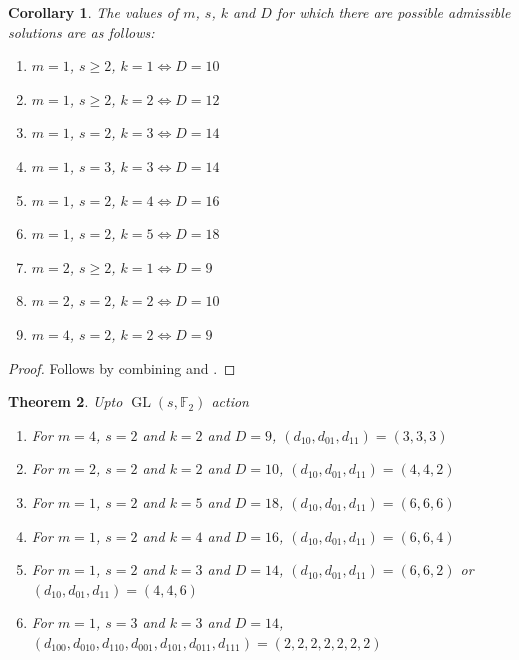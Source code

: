 \documentclass[12pt,twoside,]{amsart}
\theoremstyle{plain}
\newtheorem{theorem}{Theorem}[subsection]
\newtheorem{corollary}[theorem]{Corollary}
\theoremstyle{definition}
\begin{document}
\begin{corollary}\label{list of cases}
  The values of $m$, $s$, $k$ and $D$ for which there are possible admissible solutions are as follows: 
    \begin{enumerate}
        \item $m = 1$, $s \geq 2$, $k = 1 \iff D = 10$
        \item $m = 1$, $s \geq 2$, $k = 2 \iff D = 12$
        \item $m = 1$, $s = 2$, $k = 3 \iff D = 14$
        \item $m = 1$, $s = 3$, $k = 3 \iff D = 14$
        \item $m = 1$, $s = 2$, $k = 4 \iff D = 16$
        \item $m = 1$, $s = 2$, $k = 5 \iff D = 18$
        \item $m =2$, $s \geq 2$, $k = 1 \iff D = 9$
        \item $m = 2$, $s = 2$, $k = 2 \iff D = 10$
        \item $m = 4$, $s = 2$, $k = 2 \iff D = 9$
        
    \end{enumerate}
\end{corollary}

\begin{proof}
   Follows by combining  and . 
\end{proof}

\begin{theorem}
Upto $\operatorname{GL}(s,\mathbb{F}_2)$ action
 \begin{enumerate}
     \item For $m = 4$, $s=2$ and $k = 2$ and $D = 9$, $(d_{10}, d_{01}, d_{11}) = (3,3,3)$ 
     \item For $m = 2$, $s=2$ and $k = 2$ and $D = 10$, $(d_{10}, d_{01}, d_{11}) = (4,4,2)$ 
     \item For $m = 1$, $s=2$ and $k = 5$ and $D = 18$, $(d_{10}, d_{01}, d_{11}) = (6,6,6)$
     \item For $m = 1$, $s=2$ and $k = 4$ and $D = 16$, $(d_{10}, d_{01}, d_{11}) = (6,6,4)$
     \item For $m = 1$, $s=2$ and $k = 3$ and $D = 14$, $(d_{10}, d_{01}, d_{11}) = (6,6,2)$ or $(d_{10}, d_{01}, d_{11}) = (4,4,6)$
     \item For $m = 1$, $s=3$ and $k = 3$ and $D = 14$, 
     $(d_{100},d_{010},d_{110},d_{001},d_{101},d_{011},d_{111}) = (2,2,2,2,2,2,2)$
 
 
 \end{enumerate}   
    
\end{theorem}
\end{document}
